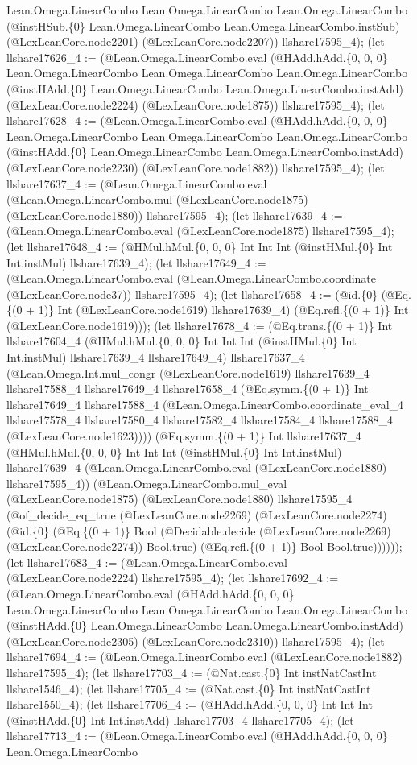 \documentclass[11pt]{article}
\begin{document}
Lean.Omega.LinearCombo Lean.Omega.LinearCombo Lean.Omega.LinearCombo (@instHSub.\{0\} Lean.Omega.LinearCombo Lean.Omega.LinearCombo.instSub) (@LexLeanCore.node2201) (@LexLeanCore.node2207)) llshare17595\_4); (let llshare17626\_4 := (@Lean.Omega.LinearCombo.eval (@HAdd.hAdd.\{0, 0, 0\} Lean.Omega.LinearCombo Lean.Omega.LinearCombo Lean.Omega.LinearCombo (@instHAdd.\{0\} Lean.Omega.LinearCombo Lean.Omega.LinearCombo.instAdd) (@LexLeanCore.node2224) (@LexLeanCore.node1875)) llshare17595\_4); (let llshare17628\_4 := (@Lean.Omega.LinearCombo.eval (@HAdd.hAdd.\{0, 0, 0\} Lean.Omega.LinearCombo Lean.Omega.LinearCombo Lean.Omega.LinearCombo (@instHAdd.\{0\} Lean.Omega.LinearCombo Lean.Omega.LinearCombo.instAdd) (@LexLeanCore.node2230) (@LexLeanCore.node1882)) llshare17595\_4); (let llshare17637\_4 := (@Lean.Omega.LinearCombo.eval (@Lean.Omega.LinearCombo.mul (@LexLeanCore.node1875) (@LexLeanCore.node1880)) llshare17595\_4); (let llshare17639\_4 := (@Lean.Omega.LinearCombo.eval (@LexLeanCore.node1875) llshare17595\_4); (let llshare17648\_4 := (@HMul.hMul.\{0, 0, 0\} Int Int Int (@instHMul.\{0\} Int Int.instMul) llshare17639\_4); (let llshare17649\_4 := (@Lean.Omega.LinearCombo.eval (@Lean.Omega.LinearCombo.coordinate (@LexLeanCore.node37)) llshare17595\_4); (let llshare17658\_4 := (@id.\{0\} (@Eq.\{(0 + 1)\} Int (@LexLeanCore.node1619) llshare17639\_4) (@Eq.refl.\{(0 + 1)\} Int (@LexLeanCore.node1619))); (let llshare17678\_4 := (@Eq.trans.\{(0 + 1)\} Int llshare17604\_4 (@HMul.hMul.\{0, 0, 0\} Int Int Int (@instHMul.\{0\} Int Int.instMul) llshare17639\_4 llshare17649\_4) llshare17637\_4 (@Lean.Omega.Int.mul\_congr (@LexLeanCore.node1619) llshare17639\_4 llshare17588\_4 llshare17649\_4 llshare17658\_4 (@Eq.symm.\{(0 + 1)\} Int llshare17649\_4 llshare17588\_4 (@Lean.Omega.LinearCombo.coordinate\_eval\_4 llshare17578\_4 llshare17580\_4 llshare17582\_4 llshare17584\_4 llshare17588\_4 (@LexLeanCore.node1623)))) (@Eq.symm.\{(0 + 1)\} Int llshare17637\_4 (@HMul.hMul.\{0, 0, 0\} Int Int Int (@instHMul.\{0\} Int Int.instMul) llshare17639\_4 (@Lean.Omega.LinearCombo.eval (@LexLeanCore.node1880) llshare17595\_4)) (@Lean.Omega.LinearCombo.mul\_eval (@LexLeanCore.node1875) (@LexLeanCore.node1880) llshare17595\_4 (@of\_decide\_eq\_true (@LexLeanCore.node2269) (@LexLeanCore.node2274) (@id.\{0\} (@Eq.\{(0 + 1)\} Bool (@Decidable.decide (@LexLeanCore.node2269) (@LexLeanCore.node2274)) Bool.true) (@Eq.refl.\{(0 + 1)\} Bool Bool.true)))))); (let llshare17683\_4 := (@Lean.Omega.LinearCombo.eval (@LexLeanCore.node2224) llshare17595\_4); (let llshare17692\_4 := (@Lean.Omega.LinearCombo.eval (@HAdd.hAdd.\{0, 0, 0\} Lean.Omega.LinearCombo Lean.Omega.LinearCombo Lean.Omega.LinearCombo (@instHAdd.\{0\} Lean.Omega.LinearCombo Lean.Omega.LinearCombo.instAdd) (@LexLeanCore.node2305) (@LexLeanCore.node2310)) llshare17595\_4); (let llshare17694\_4 := (@Lean.Omega.LinearCombo.eval (@LexLeanCore.node1882) llshare17595\_4); (let llshare17703\_4 := (@Nat.cast.\{0\} Int instNatCastInt llshare1546\_4); (let llshare17705\_4 := (@Nat.cast.\{0\} Int instNatCastInt llshare1550\_4); (let llshare17706\_4 := (@HAdd.hAdd.\{0, 0, 0\} Int Int Int (@instHAdd.\{0\} Int Int.instAdd) llshare17703\_4 llshare17705\_4); (let llshare17713\_4 := (@Lean.Omega.LinearCombo.eval (@HAdd.hAdd.\{0, 0, 0\} Lean.Omega.LinearCombo 
\end{document}

